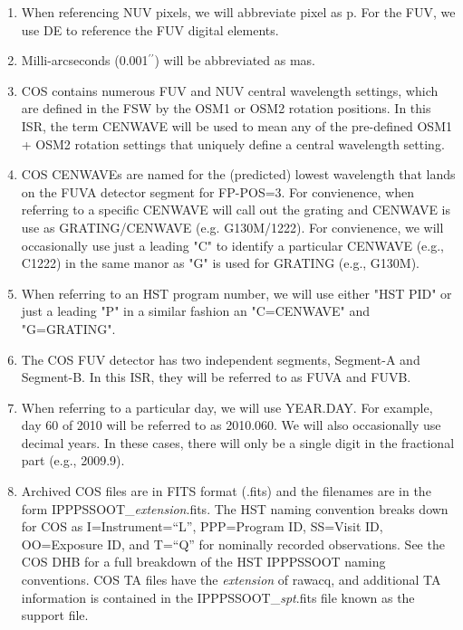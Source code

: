 \documentclass{stsci_report}
\newcommand{\psiafdate}{2010.060}
\def\arcsec{\hbox{$^{\prime\prime}$}}
\begin{document}
\begin{enumerate}
{		valued corner (C) and full size (S) for both X and Y. A box is fully specified by giving its XC, XS, YC, \& YS. In this TIR, these will always be given in detector coordinates.}
	\item{When referencing NUV pixels, we will abbreviate pixel as p. For the FUV, we use DE to reference the FUV digital elements.}
	\item{Milli-arcseconds (0.001\arcsec) will be abbreviated as mas. }
	\item{COS contains numerous FUV and NUV central wavelength settings, which are defined in the FSW by the OSM1 or OSM2 rotation positions.
	In this ISR, the term CENWAVE will be used to mean any of the pre-defined OSM1 + OSM2 rotation settings that uniquely define a central wavelength setting.}
	\item{COS CENWAVEs are named for the (predicted) lowest wavelength that lands on the FUVA detector segment for FP-POS=3. For convienence, when referring to
	a specific CENWAVE will call out the grating and CENWAVE is use as GRATING/CENWAVE (e.g. G130M/1222). For convienence, we will occasionally use just a leading "C" to identify
	a particular CENWAVE (e.g., C1222) in the same manor as "G" is used for GRATING (e.g., G130M).}
	\item{When referring to an HST program number, we will use either "HST PID" or just a leading "P" in a similar fashion an "C=CENWAVE" and "G=GRATING".}
	\item{The COS FUV detector has two independent segments, Segment-A and Segment-B. In this ISR, they will be referred to as FUVA and FUVB.}
	\item{When referring to a particular day, we will use YEAR.DAY. For example, day 60 of 2010 will be referred to as \psiafdate. We will also occasionally use decimal years. In these cases, there will only be a single digit in the fractional part (e.g., 2009.9).}
	\item{Archived COS files are in FITS format (.fits) and the filenames are in the form {\sf IPPPSSOOT\_{\it extension}.fits}.
The HST naming convention breaks down for COS as I=Instrument=``L'', PPP=Program ID, SS=Visit ID, OO=Exposure ID,
and T=``Q'' for nominally recorded observations. See the COS DHB for a full breakdown of the HST IPPPSSOOT naming conventions.
COS TA files have the {\it extension} of {\sf rawacq}, and additional
TA information is contained in the {\sf IPPPSSOOT\_{\it spt}.fits} file known as the support file.}
\end{enumerate}
\end{document}

